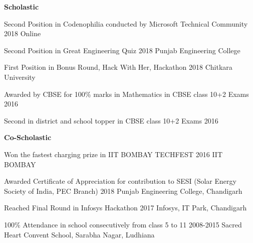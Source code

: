  
\begin{entryzlist}
\Large\textbf{Scholastic}
\vspace{5mm}
\\
\entryz

{Second Position {\normalfont in Codenophilia conducted by Microsoft Technical Community }}
{2018}
{Online}

\entryz

{Second Position {\normalfont in Great Engineering Quiz}}
{2018}
{Punjab Engineering College}

\entryz

{First Position {\normalfont in Bonus Round, Hack With Her, Hackathon}}
{2018}
{Chitkara University}

\entryz

{Awarded by CBSE for 100\% marks in Mathematics {\normalfont in CBSE class 10+2 Exams}}
{2016}
{}

\entryz

{Second in district and school topper {\normalfont in CBSE class 10+2 Exams}}
{2016}
{}

\Large\textbf{Co-Scholastic}
\vspace{5mm}
\\

\entryz

{Won the fastest charging prize {\normalfont in IIT BOMBAY TECHFEST }}
{2016}
{IIT BOMBAY}

\entryz

{Awarded Certificate of Appreciation {\normalfont for contribution to SESI (Solar Energy Society of India, PEC Branch)}}
{2018}
{Punjab Engineering College, Chandigarh}

\entryz

{Reached Final Round {\normalfont in Infosys Hackathon}}
{2017}
{Infosys, IT Park, Chandigarh}


\entryz

{100\% Attendance {\normalfont in school consecutively from class 5 to 11}}
{2008-2015}
{Sacred Heart Convent School, Sarabha Nagar, Ludhiana}


\end{entryzlist}